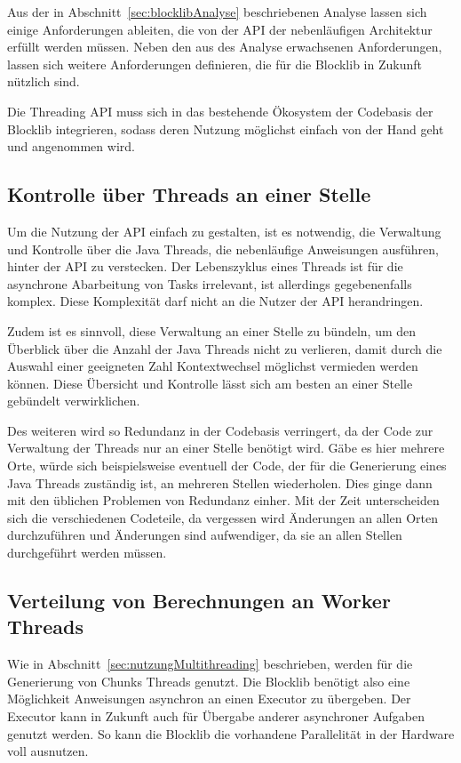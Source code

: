 Aus der in Abschnitt~\ref{sec:blocklibAnalyse} beschriebenen Analyse lassen sich einige Anforderungen ableiten, die von der API der nebenläufigen Architektur erfüllt werden müssen. Neben den aus des Analyse erwachsenen Anforderungen, lassen sich weitere Anforderungen definieren, die für die Blocklib in Zukunft nützlich sind.

Die Threading API muss sich in das bestehende Ökosystem der Codebasis der Blocklib integrieren, sodass deren Nutzung möglichst einfach von der Hand geht und angenommen wird.

\subsection{Kontrolle über Threads an einer Stelle}
Um die Nutzung der API einfach zu gestalten, ist es notwendig, die Verwaltung und Kontrolle über die Java Threads, die nebenläufige Anweisungen ausführen, hinter der API zu verstecken. Der Lebenszyklus eines Threads ist für die asynchrone Abarbeitung von Tasks  irrelevant, ist allerdings gegebenenfalls komplex. Diese Komplexität darf nicht an die Nutzer der API herandringen.

Zudem ist es sinnvoll, diese Verwaltung an einer Stelle zu bündeln, um den Überblick über die Anzahl der Java Threads nicht zu verlieren, damit durch die Auswahl einer geeigneten Zahl Kontextwechsel möglichst vermieden werden können. Diese Übersicht und Kontrolle lässt sich am besten an einer Stelle gebündelt verwirklichen.

Des weiteren wird so Redundanz in der Codebasis verringert, da der Code zur Verwaltung der Threads nur an einer Stelle benötigt wird. Gäbe es hier mehrere Orte, würde sich beispielsweise eventuell der Code, der für die Generierung eines Java Threads zuständig ist, an mehreren Stellen wiederholen. Dies ginge dann mit den üblichen Problemen von Redundanz einher. Mit der Zeit unterscheiden sich die verschiedenen Codeteile, da vergessen wird Änderungen an allen Orten durchzuführen und Änderungen sind aufwendiger, da sie an allen Stellen durchgeführt werden müssen.

\subsection{Verteilung von Berechnungen an Worker Threads}
Wie in Abschnitt~\ref{sec:nutzungMultithreading} beschrieben, werden für die Generierung von Chunks Threads genutzt. Die Blocklib benötigt also eine Möglichkeit Anweisungen asynchron an einen Executor zu übergeben. Der Executor kann in Zukunft auch für Übergabe anderer asynchroner Aufgaben genutzt werden. So kann die Blocklib die vorhandene Parallelität in der Hardware voll ausnutzen.


